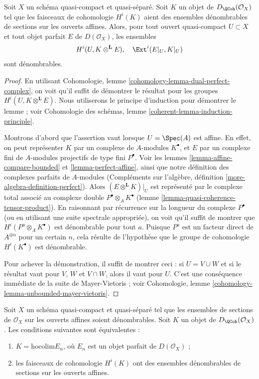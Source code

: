 \begin{lemma}
\label{lemma-countable-cohomology}
Soit $X$ un schéma quasi-compact et quasi-séparé.
Soit $K$ un objet de $D_\QCoh(\mathcal{O}_X)$
tel que les faisceaux de cohomologie $H^i(K)$ aient des ensembles
dénombrables de sections sur les ouverts affines. Alors, pour tout ouvert quasi-compact
$U \subset X$ et tout objet parfait $E$ de $D(\mathcal{O}_X)$,
les ensembles
$$
H^i(U, K \otimes^\mathbf{L} E),\quad \Ext^i(E|_U, K|_U)
$$
sont dénombrables.
\end{lemma}

\begin{proof}
En utilisant Cohomologie, lemme \ref{cohomology-lemma-dual-perfect-complex},
on voit qu'il suffit de démontrer le résultat
pour les groupes $H^i(U, K \otimes^\mathbf{L} E)$.
Nous utiliserons le principe d'induction pour démontrer le lemme ; voir
Cohomologie des schémas, lemme \ref{coherent-lemma-induction-principle}.

\medskip\noindent
Montrons d'abord que l'assertion vaut lorsque $U = \Spec(A)$ est affine. En effet, on peut
représenter $K$ par un complexe de $A$-modules $K^\bullet$, et $E$ par un
complexe fini de $A$-modules projectifs de type fini $P^\bullet$.
Voir les lemmes \ref{lemma-affine-compare-bounded} et
\ref{lemma-perfect-affine},
ainsi que notre définition des complexes parfaits de $A$-modules
(Compléments sur l'algèbre, définition \ref{more-algebra-definition-perfect}).
Alors $(E \otimes^\mathbf{L} K)|_U$ est représenté par
le complexe total associé au complexe double
$P^\bullet \otimes_A K^\bullet$
(lemme \ref{lemma-quasi-coherence-tensor-product}).
En raisonnant par récurrence sur la longueur du complexe
$P^\bullet$ (ou en utilisant une suite spectrale appropriée),
on voit qu'il suffit de montrer que
$H^i(P^a \otimes_A K^\bullet)$ est dénombrable pour tout $a$.
Puisque $P^a$ est un facteur direct de $A^{\oplus n}$ pour
un certain $n$, cela résulte de l'hypothèse que
le groupe de cohomologie $H^i(K^\bullet)$ est dénombrable.

\medskip\noindent
Pour achever la démonstration, il suffit de montrer ceci : si $U = V \cup W$
et si le résultat vaut pour $V$, $W$ et $V \cap W$, alors
il vaut pour $U$. C'est une conséquence immédiate
de la suite de Mayer-Vietoris ; voir
Cohomologie, lemme \ref{cohomology-lemma-unbounded-mayer-vietoris}.
\end{proof}

\begin{lemma}
\label{lemma-countable}
Soit $X$ un schéma quasi-compact et quasi-séparé tel que
les ensembles de sections de $\mathcal{O}_X$ sur les ouverts affines soient dénombrables.
Soit $K$ un objet de $D_\QCoh(\mathcal{O}_X)$. Les
conditions suivantes sont équivalentes :
\begin{enumerate}
\item $K = \text{hocolim} E_n$, où $E_n$ est un objet parfait de
$D(\mathcal{O}_X)$ ;
\item les faisceaux de cohomologie $H^i(K)$ ont des ensembles
dénombrables de sections sur les ouverts affines.
\end{enumerate}
\end{lemma}

